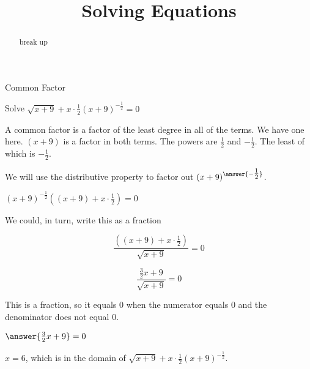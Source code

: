 \documentclass{ximera}
\title{Solving Equations}
\begin{document}
\begin{abstract}
break up
\end{abstract}
\maketitle





\begin{example}  Common Factor


Solve $\sqrt{x+9} + x \cdot \frac{1}{2} (x+9)^{-\tfrac{1}{2}} = 0$



\begin{explanation}



A common factor is a factor of the least degree in all of the terms.  We have one here. $(x+9)$ is a factor in both terms.  The powers are $\frac{1}{2}$ and $-\frac{1}{2}$. The least of which is $-\frac{1}{2}$.

We will use the distributive property to factor out $(x+9)^{\answer{-\tfrac{1}{2}}}$.


$(x+9)^{-\tfrac{1}{2}} \left((x+9) + x \cdot \frac{1}{2}\right)  = 0$


We could, in turn, write this as a fraction


\[  \frac{\left((x+9) + x \cdot \frac{1}{2}\right)}{\sqrt{x+9}} = 0 \]


\[  \frac{ \frac{3}{2} x + 9}{\sqrt{x+9}} = 0 \]



This is a fraction, so it equals $0$ when the numerator equals $0$ and the denominator does not equal $0$.


$\answer{\frac{3}{2} x + 9} = 0$



$x = 6$, which is in the domain of $\sqrt{x+9} + x \cdot \frac{1}{2} (x+9)^{-\tfrac{1}{2}}$.


\end{explanation}
\end{example}
\end{document}
